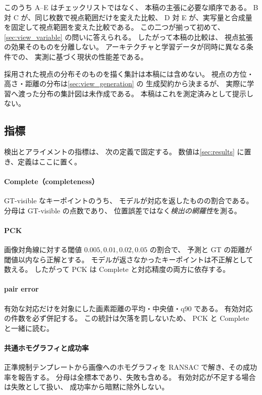 

このうち A--E はチェックリストではなく、
本稿の主張に必要な順序である。
B 対 C が、同じ枚数で視点範囲だけを変えた比較、
D 対 E が、実写量と合成量を固定して視点範囲を変えた比較である。
この二つが揃って初めて、
\cref{sec:view_variable} の問いに答えられる。
したがって本稿の比較は、
視点拡張の効果そのものを分離しない。
アーキテクチャと学習データが同時に異なる条件での、
実測に基づく現状の性能差である。

採用された視点の分布そのものを描く集計は本稿には含めない。
視点の方位・高さ・距離の分布は\cref{sec:view_generation} の
生成契約から決まるが、
実際に学習へ渡った分布の集計図は未作成である。
本稿はこれを測定済みとして提示しない。

\subsection{指標}
\label{sec:metrics}

検出とアライメントの指標は、
次の定義で固定する。
数値は\cref{sec:results} に置き、定義はここに置く。

\paragraph{Complete（completeness）}
GT-visible なキーポイントのうち、
モデルが対応を返したものの割合である。
分母は GT-visible の点数であり、
位置誤差ではなく\emph{検出の網羅性}を測る。

\paragraph{PCK}
画像対角線に対する閾値
\(0.005, 0.01, 0.02, 0.05\) の割合で、
予測と GT の距離が閾値以内なら正解とする。
モデルが返さなかったキーポイントは不正解として数える。
したがって PCK は Complete と対応精度の両方に依存する。

\paragraph{pair error}
有効な対応だけを対象にした画素距離の平均・中央値・q90 である。
有効対応の件数を必ず併記する。
この統計は欠落を罰しないため、
PCK と Complete と一緒に読む。

\paragraph{共通ホモグラフィと成功率}
正準規制テンプレートから画像へのホモグラフィを
RANSAC で解き、その成功率を報告する。
分母は全標本であり、失敗も含める。
有効対応が不足する場合は失敗として扱い、
成功率から暗黙に除外しない。

